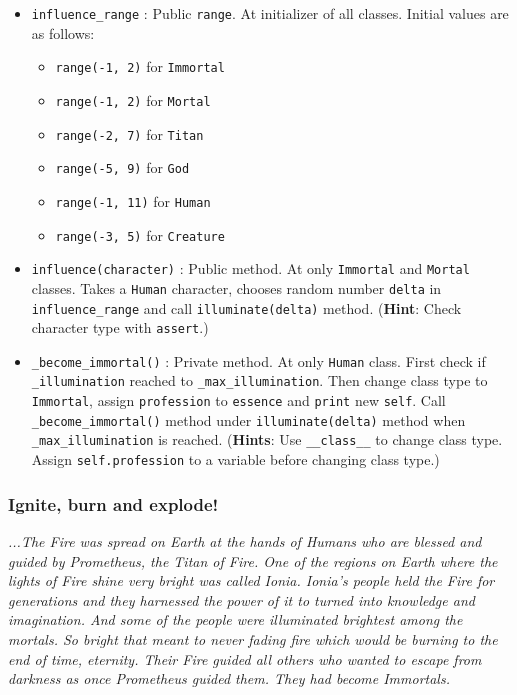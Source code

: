 \documentclass[a4paper]{article}
\begin{document}
\begin{itemize}
    \item \texttt{influence\_range} : Public \texttt{range}. At initializer of all classes. Initial values are as follows:
    \begin{itemize}
        \item \texttt{range(-1, 2)} for \texttt{Immortal}
        \item \texttt{range(-1, 2)} for \texttt{Mortal}
        \item \texttt{range(-2, 7)} for \texttt{Titan}
        \item \texttt{range(-5, 9)} for \texttt{God}
        \item \texttt{range(-1, 11)} for \texttt{Human}
        \item \texttt{range(-3, 5)} for \texttt{Creature}
    \end{itemize}
    \item \texttt{influence(character)} : Public method. At only \texttt{Immortal} and \texttt{Mortal} classes. Takes a \texttt{Human} character, chooses random number \texttt{delta} in \texttt{influence\_range} and call \texttt{illuminate(delta)} method. (\textbf{Hint}: Check character type with \texttt{assert}.)
    \item \texttt{\_become\_immortal()} : Private method. At only \texttt{Human} class. First check if \texttt{\_illumination} reached to \texttt{\_max\_illumination}. Then change class type to \texttt{Immortal}, assign \texttt{profession} to \texttt{essence} and \texttt{print} new \texttt{self}. Call \texttt{\_become\_immortal()} method under \texttt{illuminate(delta)} method when \texttt{\_max\_illumination} is reached. (\textbf{Hints}: Use \texttt{\_\_class\_\_} to change class type. Assign \texttt{self.profession} to a variable before changing class type.)
\end{itemize}

\subsubsection{Ignite, burn and explode!}

\textit{...The Fire was spread on Earth at the hands of Humans who are blessed and guided by Prometheus, the Titan of Fire. One of the regions on Earth where the lights of Fire shine very bright was called Ionia.  Ionia's people held the Fire for generations and they harnessed the power of it to turned into knowledge and imagination. And some of the people were illuminated brightest among the mortals. So bright that meant to never fading fire which would be burning to the end of time, eternity. Their Fire guided all others who wanted to escape from darkness as once Prometheus guided them. They had become Immortals.}
\end{document}
